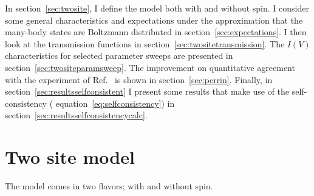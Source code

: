 In section~\ref{sec:twosite}, I define the model both with and without spin. I consider some general characteristics and expectations under the approximation that the many-body states are Boltzmann distributed in section~\ref{sec:expectations}. I then look at the transmission functions in section~\ref{sec:twositetransmission}. The $I(V)$ characteristics for selected parameter sweeps are presented in section~\ref{sec:twositeparamsweep}. The improvement on quantitative agreement with the experiment of Ref.~\cite{perrinnano} is shown in section~\ref{sec:perrin}. Finally, in section~\ref{sec:resultsselfconsistent} I present some results that make use of the self-consistency ( equation~\ref{eq:selfconsistency}) in section~\ref{sec:resultsselfconsistencycalc}.


\section{Two site model} 
The model comes in two flavors; with and without spin. 
\label{sec:twosite}
